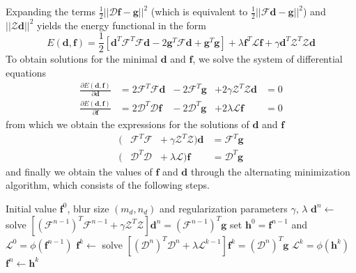 \documentclass[12pt,notitlepage]{report}
\begin{document}
Expanding the terms $\frac{1}{2}||\mathcal{D}\mathbf{f} - \mathbf{g}||^2$ (which is equivalent to $\frac{1}{2}||\mathcal{F}\mathbf{d} - \mathbf{g}||^2$) and $||\mathcal{Z} \mathbf{d}||^2$ yields the energy functional in the form
\begin{equation}
\label{eq:srou03_energy_vec_exp}
	E(\mathbf{d},\mathbf{f}) = \frac{1}{2}[\mathbf{d}^T \mathcal{F}^T \mathcal{F} \mathbf{d}  - 2 \mathbf{g}^T \mathcal{F} \mathbf{d} + \mathbf{g}^T \mathbf{g}] + \lambda \mathbf{f}^T \mathcal{L} \mathbf{f} + \gamma \mathbf{d}^T \mathcal{Z}^T \mathcal{Z} \mathbf{d}	
\end{equation}
To obtain solutions for the minimal $\mathbf{d}$ and $\mathbf{f}$, we solve the system of differential equations
\begin{equation}
\label{eq:srou03_energy_vec_partial}
	\begin{aligned}
		\frac{\partial E(\mathbf{d},\mathbf{f})}{\partial \mathbf{d}} &= 2 \mathcal{F}^T \mathcal{F} \mathbf{d} &- \ 2 \mathcal{F}^T \mathbf{g} &+ 2 \gamma \mathcal{Z}^T \mathcal{Z} \mathbf{d} &= 0 \\	
		\frac{\partial E(\mathbf{d},\mathbf{f})}{\partial \mathbf{f}} &= 2 \mathcal{D}^T \mathcal{D} \mathbf{f} &- \ 2 \mathcal{D}^T \mathbf{g} &+ 2 \lambda              \mathcal{L} \mathbf{f} &= 0
	\end{aligned}
\end{equation}
from which we obtain the expressions for the solutions of $\mathbf{d}$ and $\mathbf{f}$
\begin{equation}
\label{eq:srou03_solutions}
	\begin{aligned}
		( &\mathcal{F}^T \mathcal{F} &+ \ \gamma \mathcal{Z}^T \mathcal{Z} ) \mathbf{d} &= \mathcal{F}^T \mathbf{g} \\
		( &\mathcal{D}^T \mathcal{D} &+ \ \lambda              \mathcal{L} ) \mathbf{f} &= \mathcal{D}^T \mathbf{g}	
	\end{aligned}
\end{equation}
and finally we obtain the values of $\mathbf{f}$ and $\mathbf{d}$ through the alternating minimization algorithm, which consists of the following steps.
\begin{algorithmic}
	\REQUIRE Initial value $\mathbf{f}^0$, blur size $(m_d, n_d)$ and regularization parameters $\gamma$, $\lambda$
		\STATE $\mathbf{d}^n \gets$ solve $[(\mathcal{F}^{n - 1})^T \mathcal{F}^{n - 1} + \gamma \mathcal{Z}^T \mathcal{Z} ] \mathbf{d}^n = (\mathcal{F}^{n - 1})^T \mathbf{g}$ 
		\STATE set $\mathbf{h}^0 = \mathbf{f}^{n - 1}$ and $\mathcal{L}^0 = \phi(\mathbf{f}^{n - 1})$ 
			\STATE $\mathbf{f}^k \gets$ solve $[(\mathcal{D}^n)^T \mathcal{D}^n + \lambda \mathcal{L}^{k-1} ] \mathbf{f}^k = (\mathcal{D}^n)^T \mathbf{g}$
			\STATE $\mathcal{L}^k = \phi(\mathbf{h}^k)$
		\ENDFOR
		\STATE $\mathbf{f}^n \gets \mathbf{h}^k$
	\ENDFOR
\end{algorithmic}
\end{document}
